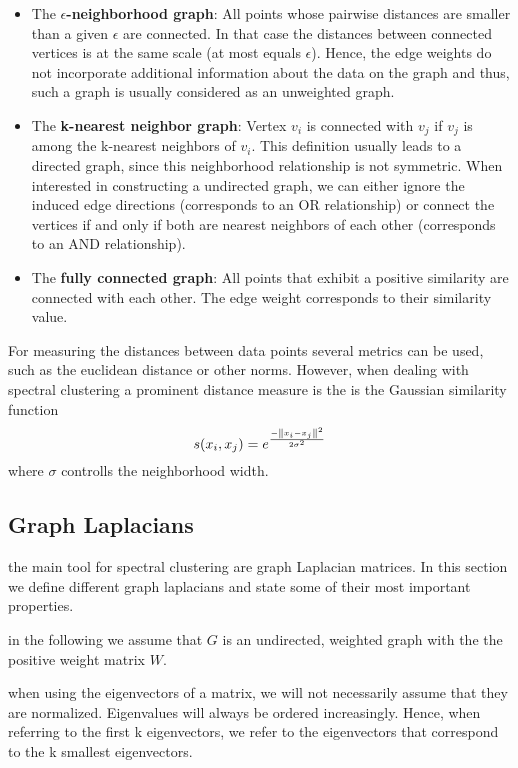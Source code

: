 \begin{itemize}
	\item The \textbf{$\epsilon$-neighborhood graph}: All points whose pairwise distances are smaller than a given $\epsilon$ are connected. In that case the distances between connected vertices is at the same scale (at most equals $\epsilon$). Hence, the edge weights do not incorporate additional information about the data on the graph and thus, such a graph is usually considered as an unweighted graph.
	\item The \textbf{k-nearest neighbor graph}: Vertex $v_i$ is connected with $v_j$ if $v_j$ is among the k-nearest neighbors of $v_i$. This definition usually leads to a directed graph, since this neighborhood relationship is not symmetric. When interested in constructing a undirected graph, we can either ignore the induced edge directions (corresponds to an OR relationship) or connect the vertices if and only if both are nearest neighbors of each other (corresponds to an AND relationship).
	\item The \textbf{fully connected graph}: All points that exhibit a positive similarity are connected with each other. The edge weight corresponds to their similarity value.
\end{itemize}
For measuring the distances between data points several metrics can be used, such as the euclidean distance or other norms. However, when dealing with spectral clustering a prominent distance measure is the is the Gaussian similarity function
\begin{equation}
	s(x_i, x_j) = e^{\frac{-\left\lVert x_i - x_j\right\rVert^2 }{2 \sigma^2}} 
\end{equation}
where $\sigma$ controlls the neighborhood width.

\subsection{Graph Laplacians}

the main tool for spectral clustering are graph Laplacian matrices.
In this section we define different graph laplacians and state some of their most important properties.

in the following we assume that $G$ is an undirected, weighted graph with the the positive weight matrix $W$.

when using the eigenvectors of a matrix, we will not necessarily assume that they are normalized. Eigenvalues will always be ordered increasingly. Hence, when referring to the first k eigenvectors, we refer to the eigenvectors that correspond to the k smallest eigenvectors.


